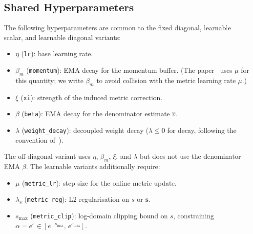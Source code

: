 \documentclass{article}
\newcommand{\vecb}[1]{\boldsymbol{#1}}
\begin{document}
\subsection{Shared Hyperparameters}
The following hyperparameters are common to the fixed diagonal, learnable scalar, and learnable diagonal variants:
\begin{itemize}
    \item $\eta$ (\texttt{lr}): base learning rate.
    \item $\beta_m$ (\texttt{momentum}): EMA decay for the momentum buffer.
    (The paper~\cite{harvey2025} uses $\mu$ for this quantity; we write $\beta_m$ to avoid collision with the metric learning rate $\mu$.)
    \item $\xi$ (\texttt{xi}): strength of the induced metric correction.
    \item $\beta$ (\texttt{beta}): EMA decay for the denominator estimate $\hat{v}$.
    \item $\lambda$ (\texttt{weight\_decay}): decoupled weight decay ($\lambda\le 0$ for decay, following the convention of~\cite{harvey2025}).
\end{itemize}
The off-diagonal variant uses $\eta$, $\beta_m$, $\xi$, and $\lambda$ but does not use the denominator EMA $\beta$.
The learnable variants additionally require:
\begin{itemize}
    \item $\mu$ (\texttt{metric\_lr}): step size for the online metric update.
    \item $\lambda_s$ (\texttt{metric\_reg}): L2 regularisation on $s$ or $\vecb{s}$.
    \item $s_{\max}$ (\texttt{metric\_clip}): log-domain clipping bound on $s$,
    constraining $\alpha = e^s \in [e^{-s_{\max}},\,e^{s_{\max}}]$.
\end{itemize}
\end{document}
